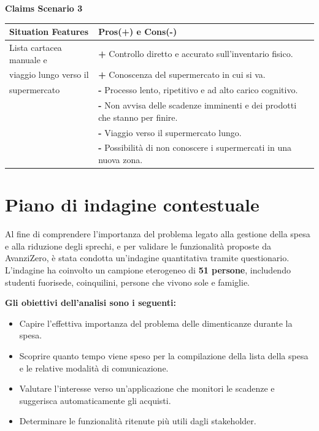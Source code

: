 \documentclass[12pt,a4paper]{article}
\begin{document}
\vspace{0.5cm}
\noindent\textbf{Claims Scenario 3}

\begin{table}[h]
\centering
\begin{tabularx}{\textwidth}{|l|X|}
\hline
\textbf{Situation Features} & \textbf{Pros(+) e Cons(-)} \\
\hline
Lista cartacea manuale e & \textbf{+} Controllo diretto e accurato sull'inventario fisico. \\
viaggio lungo verso il & \textbf{+} Conoscenza del supermercato in cui si va. \\
supermercato & \textbf{-} Processo lento, ripetitivo e ad alto carico cognitivo. \\
& \textbf{-} Non avvisa delle scadenze imminenti e dei prodotti che stanno per finire. \\
& \textbf{-} Viaggio verso il supermercato lungo. \\
& \textbf{-} Possibilità di non conoscere i supermercati in una nuova zona. \\
\hline
\end{tabularx}
\end{table}

\section{Piano di indagine contestuale}
Al fine di comprendere l'importanza del problema legato alla gestione della spesa e alla riduzione degli sprechi, e per validare le funzionalità proposte da AvanziZero, è stata condotta un'indagine quantitativa tramite questionario. L'indagine ha coinvolto un campione eterogeneo di \textbf{51 persone}, includendo studenti fuorisede, coinquilini, persone che vivono sole e famiglie.

\textbf{Gli obiettivi dell'analisi sono i seguenti:}
\begin{itemize}
    \item Capire l'effettiva importanza del problema delle dimenticanze durante la spesa.
    \item Scoprire quanto tempo viene speso per la compilazione della lista della spesa e le relative modalità di comunicazione.
    \item Valutare l'interesse verso un'applicazione che monitori le scadenze e suggerisca automaticamente gli acquisti.
    \item Determinare le funzionalità ritenute più utili dagli stakeholder.
\end{itemize}
\end{document}

